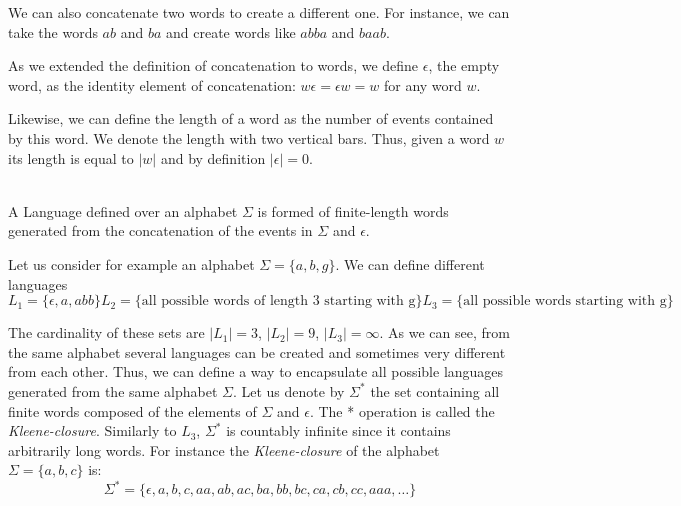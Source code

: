 We can also concatenate two words to create a different one. For instance, we can take the
words $ab$ and $ba$ and create words like $abba$ and $baab$.

As we extended the definition of concatenation to words, we define $\epsilon$,
the empty word, as the identity element of concatenation: $w\epsilon = \epsilon
w = w$ for any word $w$.

Likewise, we can define the length of a word as the number of events contained
by this word. We denote the length with two vertical bars. Thus, given a word $w$ its
length is equal to $|w|$ and by definition $|\epsilon| = 0 $.

\begin{definition}[Language]
  \label{def:language}~\\
  A Language defined over an alphabet $\Sigma$ is formed of finite-length
  words generated from the concatenation of the events in $\Sigma$ and
  $\epsilon$.
\end{definition}

Let us consider for example an alphabet $\Sigma = \{a,b,g\}$. We can define different
languages
\begin{subequations}
  \begin{equation*}
  L_1=\{\epsilon, a, abb\}
  \end{equation*}
  \begin{equation*}
  L_2=\{\text{all possible words of length 3 starting with g}\}
  \end{equation*}
  \begin{equation*}
  L_3=\{\text{all possible words starting with g}\}
  \end{equation*}
\end{subequations}

The cardinality of these sets are $|L_1|=3$, $|L_2|=9$, $|L_3|=\infty$.
As we can see, from the same alphabet several languages can be created and sometimes very different from each other. Thus, we can define a way to encapsulate all possible languages generated from
the same alphabet $\Sigma$. Let us denote by $\Sigma^*$ the set containing all
finite words composed of the elements of $\Sigma$ and $\epsilon$. The *
operation is called the \textit{Kleene-closure}. Similarly to $L_3$, $\Sigma^*$ is
countably infinite since it contains arbitrarily long words. For instance the
\textit{Kleene-closure} of the alphabet $\Sigma = \{a, b, c\}$ is:
\begin{equation*}
  \label{eq:kleeneExample}
  \Sigma^* = \{\epsilon,a,b,c,aa,ab,ac,ba,bb,bc,ca,cb,cc,aaa,\dots\} 
\end{equation*}
